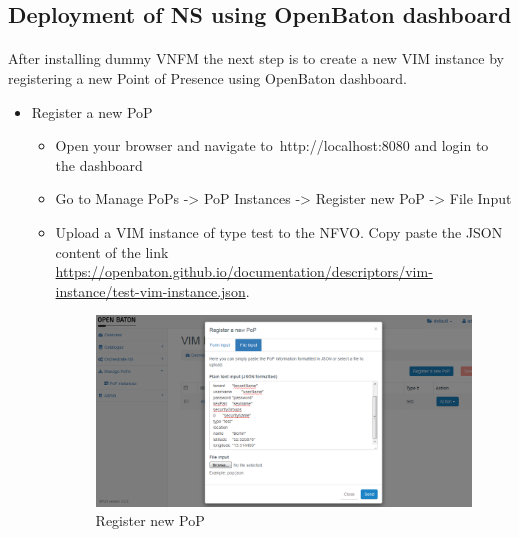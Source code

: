 			\subsection*{Deployment of NS using OpenBaton dashboard}
			\paragraph{}
			After installing dummy VNFM the next step is to create a new VIM instance by registering a new Point of Presence using OpenBaton dashboard.
			\begin{itemize}
				\item Register a new PoP
				\begin{itemize}
					\item Open your browser and navigate to http://localhost:8080 and login to the dashboard
					\item Go to Manage PoPs -> PoP Instances -> Register new PoP -> File Input
					\item Upload a VIM instance of type test to the NFVO. Copy paste the JSON content of the link 	\hyperlink{name}{https://openbaton.github.io/documentation/descriptors/vim-instance/test-vim-instance.json}. 
					\begin{figure} [h]
						\centering
						\includegraphics[width=0.7\linewidth]{figures/registerPoP}
						\caption{Register new PoP}
						\label{fig:registerPoP}
					\end{figure}
				\end{itemize}
			

\end{itemize}
